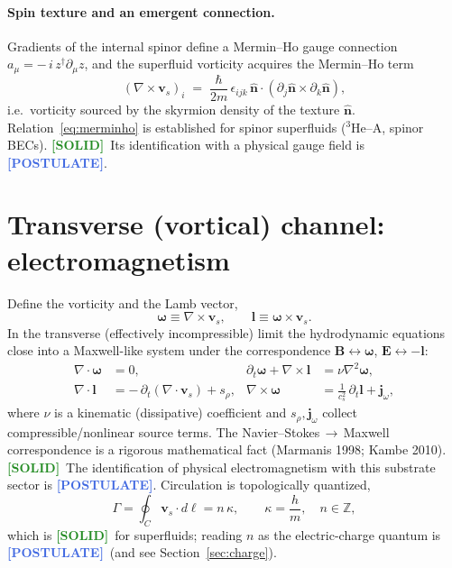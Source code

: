 \documentclass[11pt]{article}
\newcommand{\SOLID}{\textcolor{ForestGreen}{\textbf{[SOLID]}}}
\newcommand{\POSTULATE}{\textcolor{RoyalBlue}{\textbf{[POSTULATE]}}}
\begin{document}
\paragraph{Spin texture and an emergent connection.}
Gradients of the internal spinor define a Mermin--Ho gauge connection
$a_\mu = -\,i\,z^{\dagger}\partial_\mu z$, and the superfluid vorticity acquires
the Mermin--Ho term
\begin{equation}
  (\nabla\times\mathbf{v}_s)_i
  \;=\; \frac{\hbar}{2m}\,\epsilon_{ijk}\,
        \hat{\mathbf{n}}\!\cdot\!(\partial_j\hat{\mathbf{n}}\times\partial_k\hat{\mathbf{n}}),
  \label{eq:merminho}
\end{equation}
i.e.\ vorticity sourced by the skyrmion density of the texture $\hat{\mathbf n}$.
Relation~\eqref{eq:merminho} is established for spinor superfluids
($^3$He--A, spinor BECs). \SOLID\ Its identification with a physical gauge field
is \POSTULATE.

\section{Transverse (vortical) channel: electromagnetism}
Define the vorticity and the Lamb vector,
\begin{equation}
  \boldsymbol{\omega} \equiv \nabla\times\mathbf{v}_s ,
  \qquad
  \mathbf{l} \equiv \boldsymbol{\omega}\times\mathbf{v}_s .
\end{equation}
In the transverse (effectively incompressible) limit the hydrodynamic equations
close into a Maxwell-like system under the correspondence
$\mathbf{B}\leftrightarrow\boldsymbol{\omega}$,
$\mathbf{E}\leftrightarrow-\mathbf{l}$:
\begin{align}
  \nabla\!\cdot\boldsymbol{\omega} &= 0, &
  \partial_t\boldsymbol{\omega} + \nabla\times\mathbf{l} &= \nu\nabla^{2}\boldsymbol{\omega}, \\
  \nabla\!\cdot\mathbf{l} &= -\,\partial_t(\nabla\!\cdot\mathbf{v}_s) + s_\rho, &
  \nabla\times\boldsymbol{\omega} &= \frac{1}{c_s^{2}}\,\partial_t\mathbf{l} + \mathbf{j}_\omega ,
\end{align}
where $\nu$ is a kinematic (dissipative) coefficient and $s_\rho,\mathbf{j}_\omega$
collect compressible/nonlinear source terms. The Navier--Stokes$\,\to\,$Maxwell
correspondence is a rigorous mathematical fact (Marmanis 1998; Kambe 2010).
\SOLID\ The identification of physical electromagnetism with this substrate
sector is \POSTULATE. Circulation is topologically quantized,
\begin{equation}
  \Gamma = \oint_{C}\mathbf{v}_s\!\cdot d\boldsymbol{\ell} = n\,\kappa ,
  \qquad \kappa = \frac{h}{m}, \quad n\in\mathbb{Z},
\end{equation}
which is \SOLID\ for superfluids; reading $n$ as the electric-charge quantum is
\POSTULATE\ (and see Section~\ref{sec:charge}).
\end{document}
